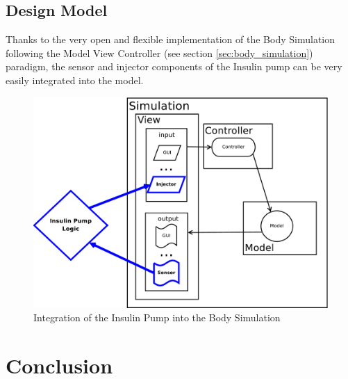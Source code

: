 \documentclass[pdflatex,a4paper,11pt,english]{scrreprt}
\begin{document}
\newpage
\section{Design Model}
Thanks to the very open and flexible implementation of the Body Simulation
following the Model View Controller (see section \vref{sec:body_simulation})
paradigm, the sensor and injector components of the Insulin pump can be very
easily integrated into the model.

\begin{figure}[htb]
\centering
\includegraphics[scale=0.39]{images/mvc_insulin_pump}
\caption{Integration of the Insulin Pump into the Body Simulation}
\label{fig:mvc_insulin_pump}
\end{figure}

\chapter{Conclusion}
\end{document}
